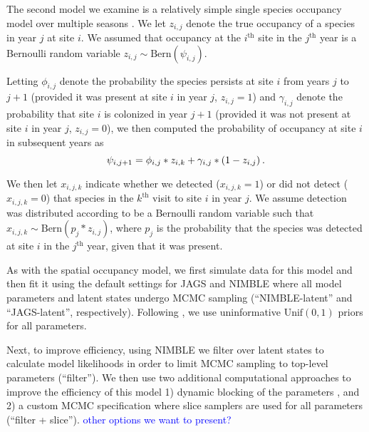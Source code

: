 \documentclass[12pt]{article}
\newcommand{\flagged}[1] {
  \textcolor{blue}{#1}
}
\begin{document}
The second model we examine is a relatively simple single species
occupancy model over multiple seasons \citep{Royle2007}. We let
$z_{i,j}$ denote the true occupancy of a species in year $j$ at site
$i$.  We assumed that occupancy at the $i^{\mathrm{th}}$ site in the
$j^{\mathrm{th}}$ year is a Bernoulli random variable $z_{i,j} \sim
\mathrm{Bern}(\psi_{i,j})$.

Letting $\phi_{i,j}$ denote the probability the species persists at
site $i$ from years $j$ to $j+1$ (provided it was present at site $i$
in year $j$, $z_{i,j}=1$) and $\gamma_{i,j}$ denote the probability
that site $i$ is colonized in year $j+1$ (provided it was not present
at site $i$ in year $j$, $z_{i,j}=0$), we then computed the
probability of occupancy at site $i$ in subsequent years as
%
\begin{equation}
  \label{eq:mutliseason}
  \psi_{i,j+1} =
  \phi_{i,j} * z_{i,k} + \gamma_{i,j} * (1-z_{i,j})\hspace{0.2em}.
\end{equation}
%

We then let $x_{i,j,k}$ indicate whether we detected ($x_{i,j,k}=1$)
or did not detect ($x_{i,j,k}=0$) that species in the
$k^{\mathrm{th}}$ visit to site $i$ in year $j$. We assume detection
was distributed according to be a Bernoulli random variable such that
$x_{i,j,k} \sim \mathrm{Bern}(p_{j}*z_{i,j})$, where $p_{j}$ is the
probability that the species was detected at site $i$ in the
$j^{\mathrm{th}}$ year, given that it was present. 

As with the spatial occupancy model, we first simulate data for this
model and then fit it using the default settings for JAGS and NIMBLE
where all model parameters and latent states undergo MCMC sampling
(``NIMBLE-latent'' and ``JAGS-latent'', respectively). Following
\cite{Royle2007, kery-schaub-11}, we use uninformative
$\mathrm{Unif}(0,1)$ priors for all parameters.

Next, to improve efficiency, using NIMBLE we filter over latent states
to calculate model likelihoods in order to limit MCMC sampling to
top-level parameters (``filter''). We then use two additional
computational approaches to improve the efficiency of this model 1)
dynamic blocking of the parameters \citep[``filter + blocking'',
][]{turek2016efficient}, and 2) a custom MCMC specification where
slice samplers \citep{neal-03} are used for all parameters (``filter +
slice''). \flagged{other options we want to present?}
\end{document}
